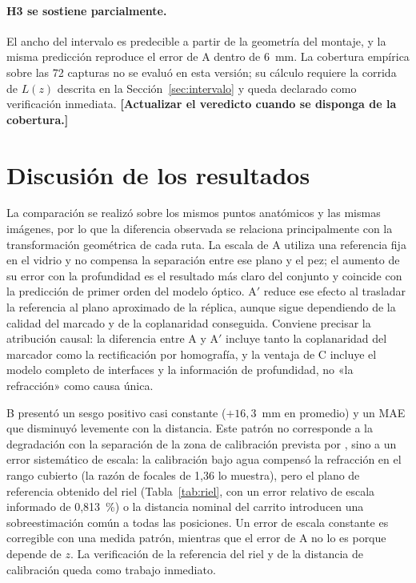 \documentclass{report}
\newcommand{\Aprime}{A$'$}
\newcommand{\pend}[1]{\textbf{[#1]}}
\begin{document}
\paragraph{H3 se sostiene parcialmente.} El ancho del intervalo es predecible a partir de la geometría del montaje, y la misma predicción reproduce el error de A dentro de 6~mm. La cobertura empírica sobre las 72 capturas no se evaluó en esta versión; su cálculo requiere la corrida de $L(z)$ descrita en la Sección~\ref{sec:intervalo} y queda declarado como verificación inmediata. \pend{Actualizar el veredicto cuando se disponga de la cobertura.}

\section{Discusión de los resultados}
\label{sec:discusion}

La comparación se realizó sobre los mismos puntos anatómicos y las mismas imágenes, por lo que la diferencia observada se relaciona principalmente con la transformación geométrica de cada ruta. La escala de A utiliza una referencia fija en el vidrio y no compensa la separación entre ese plano y el pez; el aumento de su error con la profundidad es el resultado más claro del conjunto y coincide con la predicción de primer orden del modelo óptico. \Aprime{} reduce ese efecto al trasladar la referencia al plano aproximado de la réplica, aunque sigue dependiendo de la calidad del marcado y de la coplanaridad conseguida. Conviene precisar la atribución causal: la diferencia entre A y \Aprime{} incluye tanto la coplanaridad del marcador como la rectificación por homografía, y la ventaja de C incluye el modelo completo de interfaces y la información de profundidad, no «la refracción» como causa única.

B presentó un sesgo positivo casi constante ($+16{,}3$~mm en promedio) y un MAE que disminuyó levemente con la distancia. Este patrón no corresponde a la degradación con la separación de la zona de calibración prevista por \textcite{Rofallski2022}, sino a un error sistemático de escala: la calibración bajo agua compensó la refracción en el rango cubierto (la razón de focales de 1,36 lo muestra), pero el plano de referencia obtenido del riel (Tabla~\ref{tab:riel}, con un error relativo de escala informado de 0,813~\%) o la distancia nominal del carrito introducen una sobreestimación común a todas las posiciones. Un error de escala constante es corregible con una medida patrón, mientras que el error de A no lo es porque depende de $z$. La verificación de la referencia del riel y de la distancia de calibración queda como trabajo inmediato.
\end{document}
